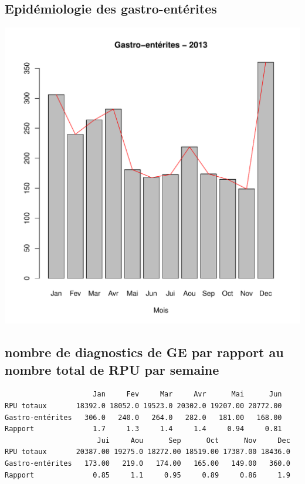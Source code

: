\documentclass[12pt,english,french,twoside]{book}\usepackage[]{graphicx}\usepackage[]{color}
\makeatletter
\def\maxwidth{ %
  \ifdim\Gin@nat@width>\linewidth
    \linewidth
  \else
    \Gin@nat@width
  \fi
}
\newenvironment{kframe}{%
 \def\at@end@of@kframe{}%
 \ifinner\ifhmode%
  \def\at@end@of@kframe{\end{minipage}}%
  \begin{minipage}{\columnwidth}%
 \fi\fi%
 \def\FrameCommand##1{\hskip\@totalleftmargin \hskip-\fboxsep
 \colorbox{shadecolor}{##1}\hskip-\fboxsep
     \hskip-\linewidth \hskip-\@totalleftmargin \hskip\columnwidth}%
 \MakeFramed {\advance\hsize-\width
   \@totalleftmargin\z@ \linewidth\hsize
   \@setminipage}}%
 {\par\unskip\endMakeFramed%
 \at@end@of@kframe}
\newenvironment{knitrout}{}{} %
\makeatother
\begin{document}
\subsection*{Epidémiologie des gastro-entérites}

\begin{knitrout}
\color{fgcolor}
\includegraphics[width=\maxwidth]{figure/ge_epidemio-1} 

\end{knitrout}

\subsection*{nombre de diagnostics de GE par rapport au nombre total de RPU par semaine}

\begin{knitrout}
\color{fgcolor}\begin{kframe}
\begin{verbatim}
                     Jan     Fev     Mar     Avr      Mai      Jun
RPU totaux       18392.0 18052.0 19523.0 20302.0 19207.00 20772.00
Gastro-entérites   306.0   240.0   264.0   282.0   181.00   168.00
Rapport              1.7     1.3     1.4     1.4     0.94     0.81
                      Jui     Aou      Sep      Oct      Nov     Dec
RPU totaux       20387.00 19275.0 18272.00 18519.00 17387.00 18436.0
Gastro-entérites   173.00   219.0   174.00   165.00   149.00   360.0
Rapport              0.85     1.1     0.95     0.89     0.86     1.9
\end{verbatim}
\end{kframe}
\end{knitrout}
\end{document}
